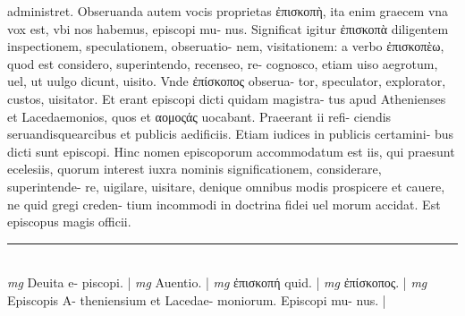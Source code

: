 \documentclass{article}
\begin{document}
\begin{pages}
administret. Obseruanda autem vocis proprietas ἐπισκοπὴ, ita enim graecem vna vox est, vbi nos habemus, episcopi mu- nus. Significat igitur ἐπισκοπὰ diligentem inspectionem, speculationem, obseruatio- nem, visitationem: a verbo ἐπισκοπὲω, quod est considero, superintendo, recenseo, re- cognosco, etiam uiso aegrotum, uel, ut uulgo dicunt, uisito. Vnde ἐπίσκοπος obserua- tor, speculator, explorator, custos, uisitator. Et erant episcopi dicti quidam magistra- tus apud Athenienses et Lacedaemonios, quos et αομοςάς uocabant. Praeerant ii refi- ciendis seruandisquearcibus et publicis aedificiis. Etiam iudices in publicis certamini- bus dicti sunt episcopi. Hinc nomen episcoporum accommodatum est iis, qui praesunt ecelesiis, quorum interest iuxra nominis significationem, considerare, superintende- re, uigilare, uisitare, denique  omnibus modis prospicere et cauere, ne quid gregi creden- tium incommodi in doctrina fidei uel morum accidat. Est episcopus magis officii.  \pend
\vspace{0.5cm}\noindent
\vspace{0.2cm}\rule{1cm}{0.2pt}\\ 
\hspace{0.2cm}\textit{mg}
\footnotesize Deuita e- piscopi. 
\normalsize| 
\hspace{0.2cm}\textit{mg}
\footnotesize Auentio. 
\normalsize| 
\hspace{0.2cm}\textit{mg}
\footnotesize ἐπισκοπή quid. 
\normalsize| 
\hspace{0.2cm}\textit{mg}
\footnotesize ἐπίσκοπος. 
\normalsize| 
\hspace{0.2cm}\textit{mg}
\footnotesize Episcopis A- theniensium et Lacedae- moniorum. Episcopi mu- nus. 
\normalsize| 
\endnumbering
\end{pages}
\end{document}
